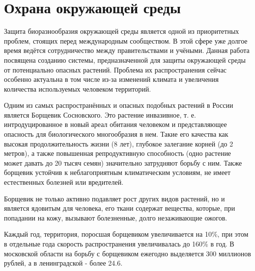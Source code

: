 
\section{Охрана окружающей среды}

\tab
Защита биоразнообразия окружающей среды является одной из приоритетных проблем, стоящих перед международным сообществом.
В этой сфере уже долгое время ведётся сотрудничество между правительствами и учёными\cite{un-biodiv}.
Данная работа посвящена созданию системы, предназначенной для защиты окружающей среды от потенциально опасных растений.
Проблема их распространения сейчас особенно актуальна в том числе из-за изменений климата\cite{poisonous-ivy} и увеличения количества используемых человеком территорий.

\nwln
Одним из самых распространённых и опасных подобных растений в России является Борщевик Сосновского\cite{heracleum-desc}.
Это растение инвазивное, т. е. интродуцированное в новый ареал обитания человеком и представляющее опасность для биологического многообразия в нем.
Такие его качества как высокая продолжительность жизни (8 лет), глубокое залегание корней (до 2 метров), а также повышенная репродуктивную способность (одно растение может давать до 20 тысяч семян) значительно затрудняют борьбу с ним.
Также борщевик устойчив к неблагоприятным климатическим условиям, не имеет естественных болезней или вредителей.

\nwln
Борщевик не только активно подавляет рост других видов растений, но и является ядовитым для человека, его ткани содержат вещества, которые, при попадании на кожу, вызывают болезненные, долго незаживающие ожогов.

\nwln
Каждый год, территория, поросшая борщевиком увеличивается на 10\%\cite{kommersant, er-initiative}, при этом в отдельные года скорость распространения увеличивалась до 160\%\cite{business-online} в год.
В московской области на борьбу с борщевиком ежегодно выделяется 300 миллионов рублей\cite{mos-expenses}, а в ленинградской - более 24.6\cite{len-expenses}.

